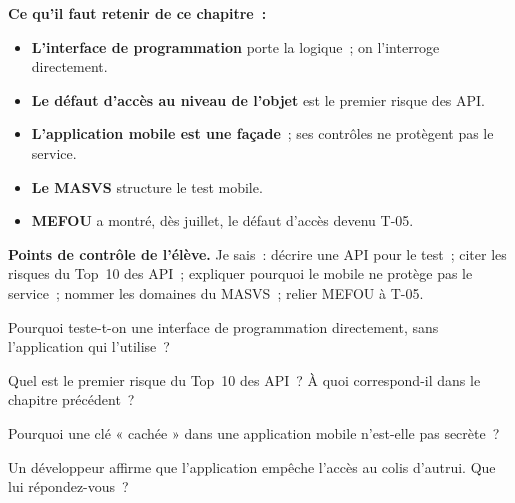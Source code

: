 \separateur

\begin{boxresume}
\textbf{Ce qu'il faut retenir de ce chapitre~:}
\begin{itemize}
    \item \textbf{L'interface de programmation} porte la logique~; on
          l'interroge directement.
    \item \textbf{Le défaut d'accès au niveau de l'objet} est le premier
          risque des API.
    \item \textbf{L'application mobile est une façade}~; ses contrôles ne
          protègent pas le service.
    \item \textbf{Le MASVS} structure le test mobile.
    \item \textbf{MEFOU} a montré, dès juillet, le défaut d'accès devenu
          T-05.
\end{itemize}
\end{boxresume}

\begin{boxinfo}
\textbf{Points de contrôle de l'élève.} Je sais~: décrire une API pour le
test~; citer les risques du Top~10 des API~; expliquer pourquoi le mobile ne
protège pas le service~; nommer les domaines du MASVS~; relier MEFOU à T-05.
\end{boxinfo}

\bigskip

\begin{boxexo}[title={\ding{45}\quad Exercice~16.1. API \niveaubase}]
Pourquoi teste-t-on une interface de programmation directement, sans
l'application qui l'utilise~?
\end{boxexo}

\begin{boxexo}[title={\ding{45}\quad Exercice~16.2. Premier risque \niveaubase}]
Quel est le premier risque du Top~10 des API~? À quoi correspond-il dans le
chapitre précédent~?
\end{boxexo}

\begin{boxexo}[title={\ding{45}\quad Exercice~16.3. Clé cachée \niveaubase}]
Pourquoi une clé « cachée » dans une application mobile n'est-elle pas
secrète~?
\end{boxexo}

\begin{boxexo}[title={\ding{45}\quad Exercice~16.4. Façade \niveaumoyen}]
Un développeur affirme que l'application empêche l'accès au colis d'autrui.
Que lui répondez-vous~?
\end{boxexo}

